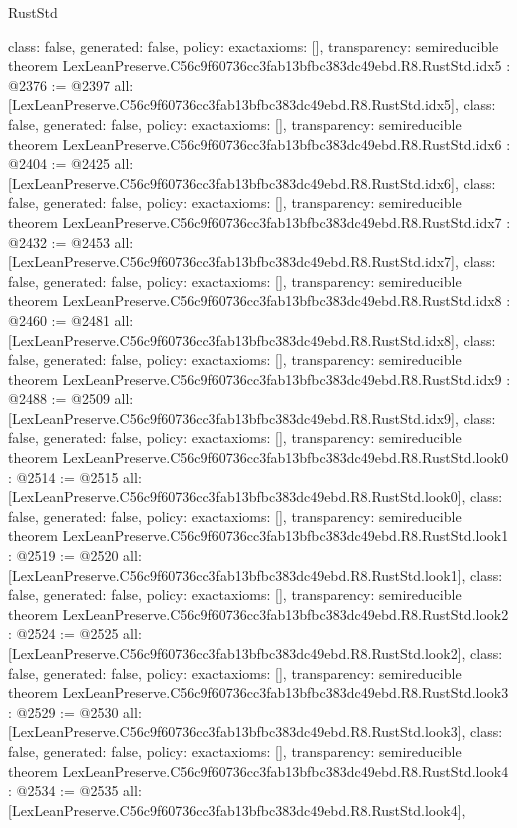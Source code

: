 \begin{lexlean}{RustStd}
\begin{coremodule}
{  class: false,
  generated: false,
  policy: exact{axioms: []},
  transparency: semireducible
}
theorem LexLeanPreserve.C56c9f60736cc3fab13bfbc383dc49ebd.R8.RustStd.idx5 : @2376 := @2397 {
  all: [LexLeanPreserve.C56c9f60736cc3fab13bfbc383dc49ebd.R8.RustStd.idx5],
  class: false,
  generated: false,
  policy: exact{axioms: []},
  transparency: semireducible
}
theorem LexLeanPreserve.C56c9f60736cc3fab13bfbc383dc49ebd.R8.RustStd.idx6 : @2404 := @2425 {
  all: [LexLeanPreserve.C56c9f60736cc3fab13bfbc383dc49ebd.R8.RustStd.idx6],
  class: false,
  generated: false,
  policy: exact{axioms: []},
  transparency: semireducible
}
theorem LexLeanPreserve.C56c9f60736cc3fab13bfbc383dc49ebd.R8.RustStd.idx7 : @2432 := @2453 {
  all: [LexLeanPreserve.C56c9f60736cc3fab13bfbc383dc49ebd.R8.RustStd.idx7],
  class: false,
  generated: false,
  policy: exact{axioms: []},
  transparency: semireducible
}
theorem LexLeanPreserve.C56c9f60736cc3fab13bfbc383dc49ebd.R8.RustStd.idx8 : @2460 := @2481 {
  all: [LexLeanPreserve.C56c9f60736cc3fab13bfbc383dc49ebd.R8.RustStd.idx8],
  class: false,
  generated: false,
  policy: exact{axioms: []},
  transparency: semireducible
}
theorem LexLeanPreserve.C56c9f60736cc3fab13bfbc383dc49ebd.R8.RustStd.idx9 : @2488 := @2509 {
  all: [LexLeanPreserve.C56c9f60736cc3fab13bfbc383dc49ebd.R8.RustStd.idx9],
  class: false,
  generated: false,
  policy: exact{axioms: []},
  transparency: semireducible
}
theorem LexLeanPreserve.C56c9f60736cc3fab13bfbc383dc49ebd.R8.RustStd.look0 : @2514 := @2515 {
  all: [LexLeanPreserve.C56c9f60736cc3fab13bfbc383dc49ebd.R8.RustStd.look0],
  class: false,
  generated: false,
  policy: exact{axioms: []},
  transparency: semireducible
}
theorem LexLeanPreserve.C56c9f60736cc3fab13bfbc383dc49ebd.R8.RustStd.look1 : @2519 := @2520 {
  all: [LexLeanPreserve.C56c9f60736cc3fab13bfbc383dc49ebd.R8.RustStd.look1],
  class: false,
  generated: false,
  policy: exact{axioms: []},
  transparency: semireducible
}
theorem LexLeanPreserve.C56c9f60736cc3fab13bfbc383dc49ebd.R8.RustStd.look2 : @2524 := @2525 {
  all: [LexLeanPreserve.C56c9f60736cc3fab13bfbc383dc49ebd.R8.RustStd.look2],
  class: false,
  generated: false,
  policy: exact{axioms: []},
  transparency: semireducible
}
theorem LexLeanPreserve.C56c9f60736cc3fab13bfbc383dc49ebd.R8.RustStd.look3 : @2529 := @2530 {
  all: [LexLeanPreserve.C56c9f60736cc3fab13bfbc383dc49ebd.R8.RustStd.look3],
  class: false,
  generated: false,
  policy: exact{axioms: []},
  transparency: semireducible
}
theorem LexLeanPreserve.C56c9f60736cc3fab13bfbc383dc49ebd.R8.RustStd.look4 : @2534 := @2535 {
  all: [LexLeanPreserve.C56c9f60736cc3fab13bfbc383dc49ebd.R8.RustStd.look4],
}
\end{coremodule}
\end{lexlean}
